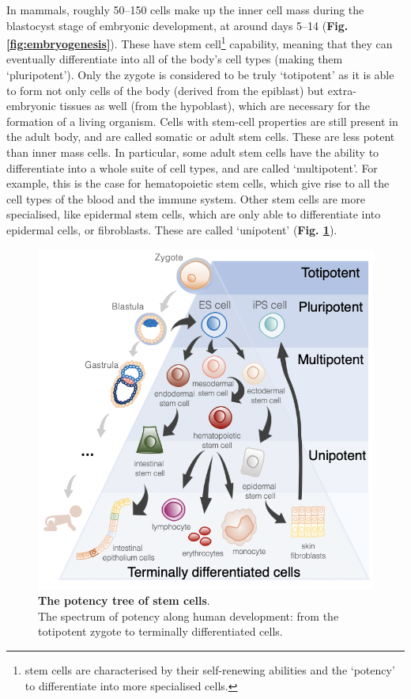 In mammals, roughly 50–150 cells make up the inner cell mass during the blastocyst stage of embryonic development, at around days 5–14 (\textbf{Fig. \ref{fig:embryogenesis}}). 
These have stem cell\footnote{stem cells are characterised by their self-renewing abilities and the `potency' to differentiate into more specialised cells.} capability, meaning that they can eventually differentiate into all of the body's cell types (making them `pluripotent').
Only the zygote is considered to be truly `totipotent' as it is able to form not only cells of the body (derived from the epiblast) but extra-embryonic tissues as well (from the hypoblast), which are necessary for the formation of a living organism.
Cells with stem-cell properties are still present in the adult body, and are called somatic or adult stem cells.
These are less potent than inner mass cells.
In particular, some adult stem cells have the ability to differentiate into a whole suite of cell types, and are called `multipotent'.
For example, this is the case for hematopoietic stem cells, which give rise to all the cell types of the blood and the immune system.
Other stem cells are more specialised, like epidermal stem cells, which are only able to differentiate into epidermal cells, or fibroblasts.
These are called `unipotent' (\textbf{Fig. \ref{fig:stem_cells}}).\\

\begin{figure}[htbp]
\centering
\includegraphics[width=16cm]{Chapter1/Fig/stem_cell_potency.png}
\caption[Stem Cells]{\textbf{The potency tree of stem cells}.\\
The spectrum of potency along human development: from the totipotent zygote to terminally differentiated cells.}
\label{fig:stem_cells}
\end{figure}

